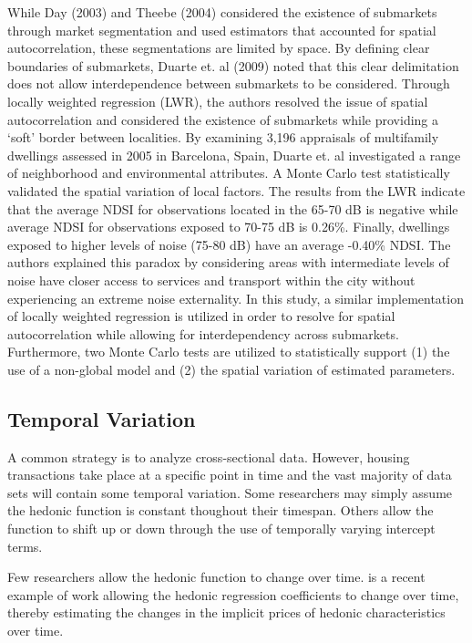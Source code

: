 \documentclass{article}\usepackage{graphicx, color}
\begin{document}
While Day (2003) and Theebe (2004) considered the existence of submarkets through market segmentation and used estimators that accounted for spatial autocorrelation, these segmentations are limited by space. By defining clear boundaries of submarkets, Duarte et. al (2009) noted that this clear delimitation does not allow interdependence between submarkets to be considered. Through locally weighted regression (LWR), the authors resolved the issue of spatial autocorrelation and considered the existence of submarkets while providing a ‘soft’ border between localities. By examining 3,196 appraisals of multifamily dwellings assessed in 2005 in Barcelona, Spain, Duarte et. al investigated a range of neighborhood and environmental attributes.  A Monte Carlo test statistically validated the spatial variation of local factors. The results from the LWR indicate that the average NDSI for observations located in the 65-70 dB is negative  while average NDSI for observations exposed to 70-75 dB is 0.26\%. Finally, dwellings exposed to higher levels of noise (75-80 dB) have an average -0.40\% NDSI. The authors explained this paradox by considering areas with intermediate levels of noise have closer access to services and transport within the city without experiencing an extreme noise externality. In this study, a similar implementation of locally weighted regression is utilized in order to resolve for spatial autocorrelation while allowing for interdependency across submarkets. Furthermore, two Monte Carlo tests are utilized to statistically support (1) the use of a non-global model and (2) the spatial variation of estimated parameters. 

\subsection{Temporal Variation}
A common strategy is to analyze cross-sectional data. However, housing transactions take place at a specific point in time and the vast majority of data sets will contain some temporal variation. Some researchers may simply assume the hedonic function is constant thoughout their timespan. Others allow the function to shift up or down through the use of temporally varying intercept terms.

Few researchers allow the hedonic function to change over time. \citet{Cho} is a recent example of work allowing the hedonic regression coefficients to change over time, thereby estimating the changes in the implicit prices of hedonic characteristics over time. 
\end{document}
